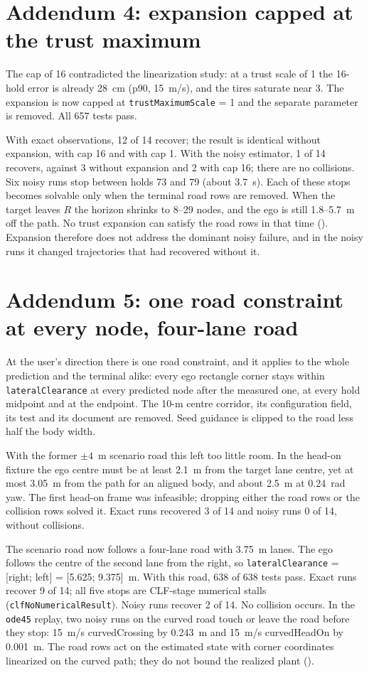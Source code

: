 \documentclass[11pt]{article}
\begin{document}
\section{Addendum 4: expansion capped at the trust maximum}
The cap of 16 contradicted the linearization study: at a trust scale of 1 the
16-hold error is already 28~cm (p90, 15~m/s), and the tires saturate near 3.
The expansion is now capped at \texttt{trustMaximumScale} = 1 and the separate
parameter is removed. All 657 tests pass.

With exact observations, 12 of 14 recover; the result is identical without
expansion, with cap 16 and with cap 1. With the noisy estimator, 1 of 14
recovers, against 3 without expansion and 2 with cap 16; there are no
collisions. Six noisy runs stop between holds 73 and 79 (about 3.7~s). Each of
these stops becomes solvable only when the terminal road rows are removed.
When the target leaves $R$ the horizon shrinks to 8--29 nodes, and the ego is
still 1.8--5.7~m off the path. No trust expansion can satisfy the road rows
in that time (). Expansion therefore does not
address the dominant noisy failure, and in the noisy runs it changed
trajectories that had recovered without it.

\section{Addendum 5: one road constraint at every node, four-lane road}
At the user's direction there is one road constraint, and it applies to the
whole prediction and the terminal alike: every ego rectangle corner stays
within \texttt{lateralClearance} at every predicted node after the measured
one, at every hold midpoint and at the endpoint. The 10-m centre corridor, its
configuration field, its test and its document are removed. Seed guidance is
clipped to the road less half the body width.

With the former $\pm4$~m scenario road this left too little room. In the
head-on fixture the ego centre must be at least 2.1~m from the target lane
centre, yet at most 3.05~m from the path for an aligned body, and about 2.5~m
at 0.24~rad yaw. The first head-on frame was infeasible; dropping either the
road rows or the collision rows solved it. Exact runs recovered 3 of 14 and
noisy runs 0 of 14, without collisions.

The scenario road now follows a four-lane road with 3.75~m lanes. The ego
follows the centre of the second lane from the right, so
\texttt{lateralClearance} = [right; left] = [5.625; 9.375]~m. With
this road, 638 of 638 tests pass. Exact runs recover 9 of 14; all five stops
are CLF-stage numerical stalls (\texttt{clfNoNumericalResult}). Noisy runs
recover 2 of 14. No collision occurs. In the \texttt{ode45} replay, two noisy runs on the
curved road touch or leave the road before they stop: 15~m/s curvedCrossing by
0.243~m and 15~m/s curvedHeadOn by 0.001~m. The road rows act on the estimated
state with corner coordinates linearized on the curved path; they do not bound
the realized plant
().
\end{document}
